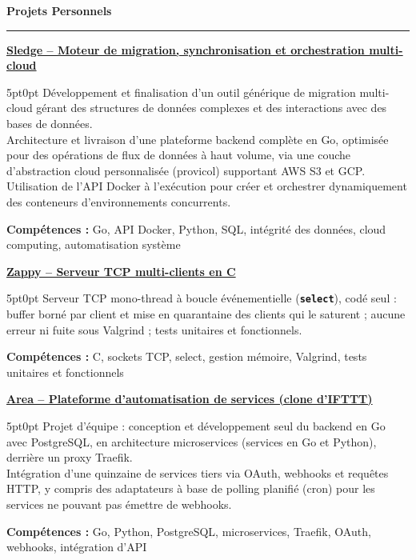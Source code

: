 \documentclass[9pt]{extarticle}
\begin{document}
\par\vspace{5pt}

{\large\bfseries Projets Personnels}
\par\vspace{-8pt}
\rule{\linewidth}{0.4pt}
\par\vspace{5pt}

\underline{\bfseries Sledge -- Moteur de migration, synchronisation et orchestration multi-cloud}
\par
\begin{adjustwidth}{5pt}{0pt}
    Développement et finalisation d'un outil générique de migration multi-cloud gérant des structures de données complexes et des interactions avec des bases de données. \\
    Architecture et livraison d'une plateforme backend complète en Go, optimisée pour des opérations de flux de données à haut volume, via une couche d'abstraction cloud personnalisée ({\ttfamily provicol}) supportant AWS S3 et GCP. \\
    Utilisation de l'API Docker à l'exécution pour créer et orchestrer dynamiquement des conteneurs d'environnements concurrents.
\end{adjustwidth}
\par
{\bfseries Compétences :} Go, API Docker, Python, SQL, intégrité des données, cloud computing, automatisation système

\par\vspace{8pt}

\underline{\bfseries Zappy -- Serveur TCP multi-clients en C}
\par
\begin{adjustwidth}{5pt}{0pt}
    Serveur TCP mono-thread à boucle événementielle ({\bfseries \texttt{select}}), codé seul : buffer borné par client et mise en quarantaine des clients qui le saturent ; aucune erreur ni fuite sous Valgrind ; tests unitaires et fonctionnels.
\end{adjustwidth}
\par
{\bfseries Compétences :} C, sockets TCP, select, gestion mémoire, Valgrind, tests unitaires et fonctionnels

\par\vspace{8pt}

\underline{\bfseries Area -- Plateforme d'automatisation de services (clone d'IFTTT)}
\par
\begin{adjustwidth}{5pt}{0pt}
    Projet d'équipe : conception et développement seul du backend en Go avec PostgreSQL, en architecture microservices (services en Go et Python), derrière un proxy Traefik. \\
    Intégration d'une quinzaine de services tiers via OAuth, webhooks et requêtes HTTP, y compris des adaptateurs à base de polling planifié (cron) pour les services ne pouvant pas émettre de webhooks.
\end{adjustwidth}
\par
{\bfseries Compétences :} Go, Python, PostgreSQL, microservices, Traefik, OAuth, webhooks, intégration d'API
\end{document}
